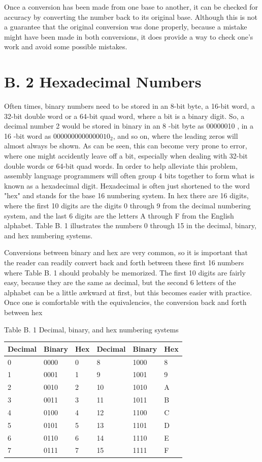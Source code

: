 \documentclass[10pt]{book}
\begin{document}
Once a conversion has been made from one base to another, it can be checked for accuracy by converting the number back to its original base. Although this is not a guarantee that the original conversion was done properly, because a mistake might have been made in both conversions, it does provide a way to check one's work and avoid some possible mistakes.

\section*{B. 2 Hexadecimal Numbers}
Often times, binary numbers need to be stored in an 8-bit byte, a 16-bit word, a 32-bit double word or a 64-bit quad word, where a bit is a binary digit. So, a decimal number 2 would be stored in binary in an 8 -bit byte as 00000010 , in a 16 -bit word as $0000000000000010_{2}$, and so on, where the leading zeros will almost always be shown. As can be seen, this can become very prone to error, where one might accidently leave off a bit, especially when dealing with 32-bit double words or 64-bit quad words. In order to help alleviate this problem, assembly language programmers will often group 4 bits together to form what is known as a hexadecimal digit. Hexadecimal is often just shortened to the word "hex" and stands for the base 16 numbering system. In hex there are 16 digits, where the first 10 digits are the digits 0 through 9 from the decimal numbering system, and the last 6 digits are the letters A through F from the English alphabet. Table B. 1 illustrates the numbers 0 through 15 in the decimal, binary, and hex numbering systems.

Conversions between binary and hex are very common, so it is important that the reader can readily convert back and forth between these first 16 numbers where Table B. 1 should probably be memorized. The first 10 digits are fairly easy, because they are the same as decimal, but the second 6 letters of the alphabet can be a little awkward at first, but this becomes easier with practice. Once one is comfortable with the equivalencies, the conversion back and forth between hex

Table B. 1 Decimal, binary, and hex numbering systems

\begin{center}
\begin{tabular}{|l|l|l|l|l|l|}
\hline
Decimal & Binary & Hex & Decimal & Binary & Hex \\
\hline
0 & 0000 & 0 & 8 & 1000 & 8 \\
\hline
1 & 0001 & 1 & 9 & 1001 & 9 \\
\hline
2 & 0010 & 2 & 10 & 1010 & A \\
\hline
3 & 0011 & 3 & 11 & 1011 & B \\
\hline
4 & 0100 & 4 & 12 & 1100 & C \\
\hline
5 & 0101 & 5 & 13 & 1101 & D \\
\hline
6 & 0110 & 6 & 14 & 1110 & E \\
\hline
7 & 0111 & 7 & 15 & 1111 & F \\
\hline
\end{tabular}
\end{center}
\end{document}
